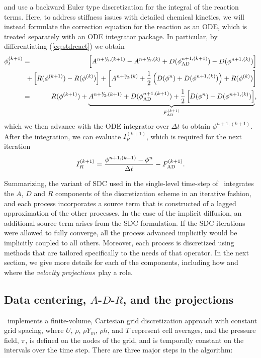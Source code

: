 and use a backward Euler type discretization for the integral of the reaction terms.
Here, to address stiffness issues with detailed chemical kinetics, we will instead
formulate the correction equation for the 
reaction as an ODE, which is treated separately with an ODE integrator package.
In particular, by differentiating (\ref{eq:stdreact}) we obtain
\begin{eqnarray}
{\phi}^{(k+1)}_t &=& \left[ A^{n+\myhalf,(k+1)} - A^{n+\myhalf,(k)} + D(\phi_{\rm AD}^{n+1,(k+1)}) - D(\phi^{n+1,(k)}) \right]\nonumber\\
&&\hspace{-0.5cm}+ \left[R(\phi^{(k+1)}) - R(\phi^{(k)})\right] + \left[A^{n+\myhalf,(k)} + \half\left(D(\phi^n) + D(\phi^{n+1,(k)})\right) + R(\phi^{(k)})\right]\nonumber\\
&=& R(\phi^{(k+1)}) + \underbrace{A^{n+\myhalf,(k+1)} + D(\phi_{\rm AD}^{n+1,(k+1)}) + \half\left[D(\phi^n) - D(\phi^{n+1,(k)})\right]}_{F_{\rm AD}^{(k+1)}}, \label{eq:MISDCint}
\end{eqnarray}
which we then advance with the ODE integrator over $\Delta t$ to obtain $\phi^{n+1,(k+1)}$.
After the integration, we can evaluate $I_R^{(k+1)}$, which is required for the next iteration
\begin{equation}
I_R^{(k+1)} = \frac{\phi^{n+1,(k+1)} - \phi^n}{\Delta t} - F_{\rm AD}^{(k+1)}.
\end{equation}

Summarizing, the variant of SDC used in the single-level time-step of \pelelm\ integrates the $A$, $D$ and $R$ components of the discretization scheme in an iterative fashion, and each process incorporates a source term that is constructed of a lagged approximation of the other processes. In the case of the implicit diffusion, an additional source term arises from the SDC formulation.  If the SDC iterations were allowed to fully converge, all the process advanced implicitly would be implicitly coupled to all others.  Moreover, each process is discretized using methods that are tailored specifically to the needs of that operator. In the next section, we give more details for each of the components, including how and where the \textit{velocity projections}\ play a role.


\subsection{Data centering, $A$-$D$-$R$, and the projections}
\pelelm\ implements a finite-volume, Cartesian grid discretization approach with constant grid spacing, where
$U$, $\rho$, $\rho Y_m$, $\rho h$, and $T$ represent cell averages, and the pressure field, $\pi$, is defined on the nodes
of the grid, and is temporally constant on the intervals over the time step. There are three major steps in the algorithm:\\

